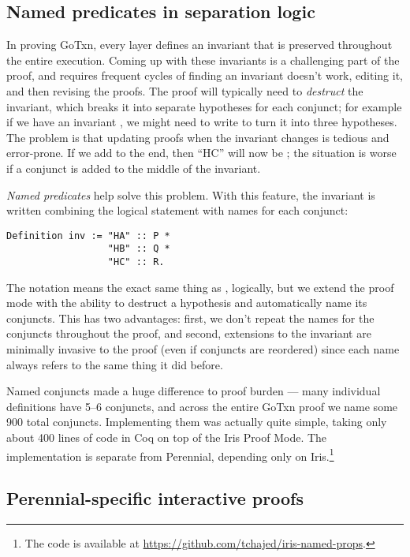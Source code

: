 \subsection{Named predicates in separation logic}

In proving GoTxn, every layer defines an invariant that is preserved throughout
the entire execution. Coming up with these invariants is a challenging part of
the proof, and requires frequent cycles of finding an invariant doesn't work,
editing it, and then revising the proofs. The proof will typically need to
\emph{destruct} the invariant, which breaks it into separate hypotheses for each
conjunct; for example if we have an invariant , we might
need to write  to turn it into three
hypotheses. The problem is that updating proofs when the invariant changes is
tedious and error-prone. If we add  to the end, then ``HC'' will now be
; the situation is worse if a conjunct is added to the middle of the
invariant.

\emph{Named predicates} help solve this problem. With this feature, the
invariant is written combining the logical statement with names for each conjunct:
\begin{verbatim}
Definition inv := "HA" :: P *
                  "HB" :: Q *
                  "HC" :: R.
\end{verbatim}
The notation  means the exact same thing as , logically, but
we extend the proof mode with the ability to destruct a hypothesis and
automatically name its conjuncts. This has two advantages: first, we don't repeat
the names for the conjuncts throughout the proof, and second, extensions to the
invariant are minimally invasive to the proof (even if conjuncts are reordered)
since each name always refers to the same thing it did before.

Named conjuncts made a huge difference to proof burden --- many individual
definitions have 5--6 conjuncts, and across the entire GoTxn proof we name some
900 total conjuncts. Implementing them was actually quite simple, taking only
about 400 lines of code in Coq on top of the Iris Proof Mode. The implementation
is separate from Perennial, depending only on Iris.\footnote{The code is
available at \url{https://github.com/tchajed/iris-named-props}.}


\subsection{Perennial-specific interactive proofs}

